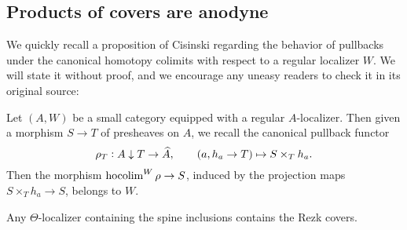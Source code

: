 \subsection{Products of covers are anodyne}
We quickly recall a proposition of Cisinski regarding the behavior of pullbacks under the canonical homotopy colimits with respect to a regular localizer \(W\).  We will state it without proof, and we encourage any uneasy readers to check it in its original source:
\begin{prop}\label{fibcolim} Let \((A,W)\) be a small category equipped with a regular \(A\)-localizer. Then given a morphism \(S\to T\) of presheaves on \(A\), we recall the canonical pullback functor
\[\rho_T:A\downarrow T \to \widehat{A}, \qquad (a,h_a\to T)\mapsto S\times_T h_a.\]
Then the morphism \(\operatorname{hocolim}^W\rho\to S\), induced by the projection maps \(S\times_T h_a\to S\), belongs to \(W\).
\end{prop}
\begin{lemma}\label{coversweak} Any \(\Theta\)-localizer containing the spine inclusions contains the Rezk covers. 
\end{lemma}
